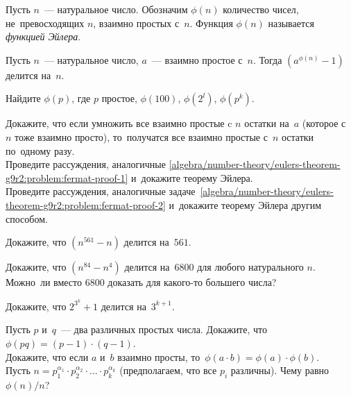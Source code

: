 Пусть $n$~--- натуральное число.
Обозначим $\phi(n)$ количество чисел, не~превосходящих $n$, взаимно простых
с~$n$.
Функция $\phi(n)$ называется \emph{функцией Эйлера}.

Пусть $n$~--- натуральное число, $a$~--- взаимно простое с~$n$.
Тогда $(a^{\phi(n)} - 1)$ делится на~$n$.

\begin{problems}

\item
Найдите $\phi(p)$, где $p$ простое, $\phi(100)$, $\phi(2^l)$, $\phi(p^k)$.

\item
\subproblem
Докажите, что если умножить все взаимно простые c $n$ остатки на~$a$
(которое с~$n$ тоже взаимно просто), то~получатся все взаимно простые с~$n$
остатки по~одному разу.
\\
\subproblem
Проведите рассуждения, аналогичные
\ref{algebra/number-theory/eulers-theorem-g9r2:problem:fermat-proof-1}
и~докажите теорему Эйлера.
\\
\subproblem
Проведите рассуждения, аналогичные
задаче~\ref{algebra/number-theory/eulers-theorem-g9r2:problem:fermat-proof-2}
и~докажите теорему Эйлера другим способом.

\item
Докажите, что $(n^{561} - n)$ делится на~$561$.

\item
\subproblem
Докажите, что $(n^{84} - n^4)$ делится на~6800 для любого натурального $n$.
\\
\subproblem
Можно~ли вместо 6800 доказать для какого-то большего числа?

\item
Докажите, что $2^{3^k} + 1$ делится на~$3^{k+1}$.

\item
\subproblem
Пусть $p$ и~$q$~--- два различных простых числа.
Докажите, что $\phi(pq) = (p - 1) \cdot (q - 1)$.
\\
\subproblem
Докажите, что если $a$ и~$b$ взаимно просты,
то~$\phi(a \cdot b) = \phi(a) \cdot \phi(b)$.
\\
\subproblem
Пусть
\(
    n
=
    p_1^{\alpha_1} \cdot p_2^{\alpha_2} \cdot \ldots \cdot p_k^{\alpha_k}
\)
(предполагаем, что все $p_i$ различны).
Чему равно $\phi(n) / n$?

\end{problems}

